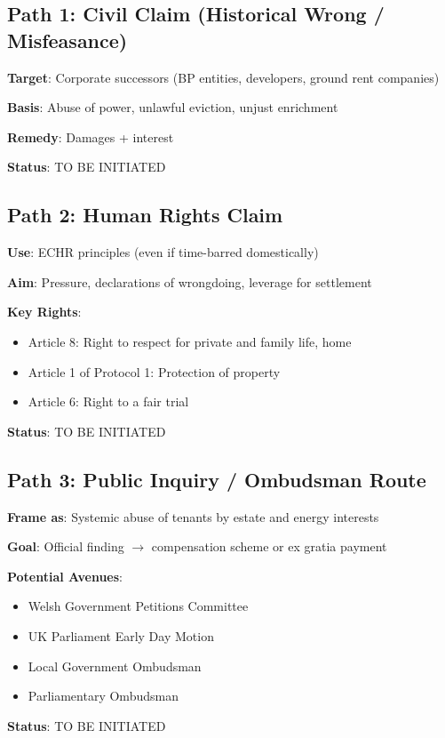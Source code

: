 \documentclass[11pt,a4paper]{article}
\begin{document}
\subsection{Path 1: Civil Claim (Historical Wrong / Misfeasance)}

\begin{action}
\textbf{Target}: Corporate successors (BP entities, developers, ground rent companies)

\textbf{Basis}: Abuse of power, unlawful eviction, unjust enrichment

\textbf{Remedy}: Damages + interest

\textbf{Status}: TO BE INITIATED
\end{action}

\subsection{Path 2: Human Rights Claim}

\begin{action}
\textbf{Use}: ECHR principles (even if time-barred domestically)

\textbf{Aim}: Pressure, declarations of wrongdoing, leverage for settlement

\textbf{Key Rights}:
\begin{itemize}
    \item Article 8: Right to respect for private and family life, home
    \item Article 1 of Protocol 1: Protection of property
    \item Article 6: Right to a fair trial
\end{itemize}

\textbf{Status}: TO BE INITIATED
\end{action}

\subsection{Path 3: Public Inquiry / Ombudsman Route}

\begin{action}
\textbf{Frame as}: Systemic abuse of tenants by estate and energy interests

\textbf{Goal}: Official finding $\rightarrow$ compensation scheme or ex gratia payment

\textbf{Potential Avenues}:
\begin{itemize}
    \item Welsh Government Petitions Committee
    \item UK Parliament Early Day Motion
    \item Local Government Ombudsman
    \item Parliamentary Ombudsman
\end{itemize}

\textbf{Status}: TO BE INITIATED
\end{action}
\end{document}
